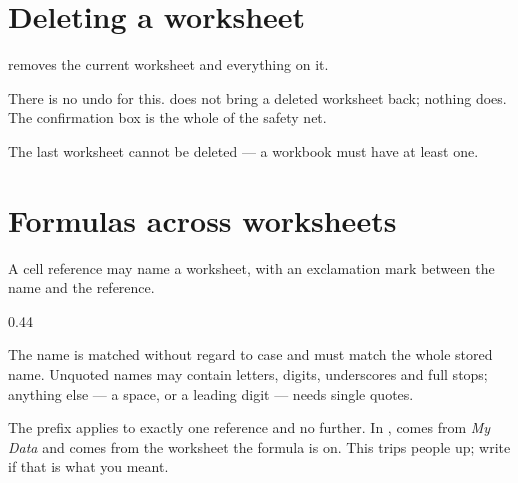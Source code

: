 \section{Deleting a worksheet}

 removes the current worksheet and everything on it.

\begin{ccfigure}
\caption{Confirming a worksheet deletion}
\label{fig:sheetdel}
\end{ccfigure}

\begin{cccaution}
There is no undo for this.  does not bring a deleted worksheet back;
nothing does. The confirmation box is the whole of the safety net.
\end{cccaution}

The last worksheet cannot be deleted --- a workbook must have at least one.

\section{Formulas across worksheets}

A cell reference may name a worksheet, with an exclamation mark between the
name and the reference.

\begin{ccexamples}{0.44\linewidth}
\end{ccexamples}

The name is matched without regard to case and must match the whole stored
name. Unquoted names may contain letters, digits, underscores and full stops;
anything else --- a space, or a leading digit --- needs single quotes.

\begin{ccnote}
The prefix applies to exactly one reference and no further. In
,  comes from \emph{My Data} and
 comes from the worksheet the formula is on. This trips people up;
write  if that is what you meant.
\end{ccnote}

